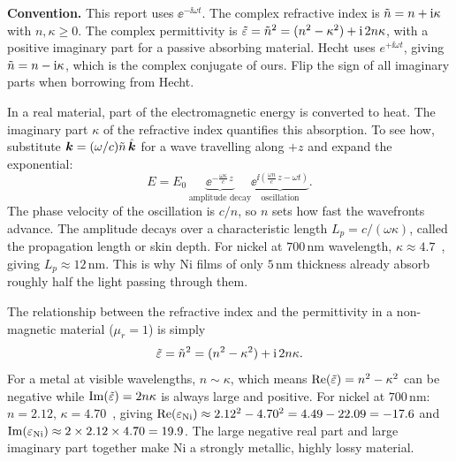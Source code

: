 \begin{warnbox}
\textbf{Convention.} This report uses $\ee^{-\ii\omega t}$. The complex
refractive index is $\tilde{n} = n + \mathrm{i}\kappa$ with $n, \kappa \geq 0$. The complex
permittivity is $\tilde{\varepsilon} = \tilde{n}^2 = (n^2 - \kappa^2) + \mathrm{i}\,2n\kappa$,
with a positive imaginary part for a passive absorbing material. Hecht uses
$e^{+\ii\omega t}$, giving $\tilde{n} = n - \mathrm{i}\kappa$, which is the complex
conjugate of ours. Flip the sign of all imaginary parts when borrowing from
Hecht.
\end{warnbox}

In a real material, part of the electromagnetic energy is converted to heat.
The imaginary part $\kappa$ of the refractive index quantifies this absorption.
To see how, substitute $\bm{k} = (\omega/c)\tilde{n}\,\hat{\bm{k}}$ for a wave
travelling along $+z$ and expand the exponential:
\begin{equation}
  E = E_0 \,
  \underbrace{\ee^{-\frac{\omega\kappa}{c}\,z}}_{\text{amplitude decay}}
  \underbrace{\ee^{\ii\!\left(\frac{\omega n}{c}\,z - \omega t\right)}}_{\text{oscillation}}.
  \label{eq:ch2_absorbing_wave}
\end{equation}
The phase velocity of the oscillation is $c/n$, so $n$ sets how fast the
wavefronts advance. The amplitude decays over a characteristic length
$L_p = c/(\omega\kappa)$, called the propagation length or skin depth. For
nickel at $700$\,nm wavelength, $\kappa \approx 4.7$~\cite{johnson_christy},
giving $L_p \approx 12$\,nm. This is why Ni films of only $5$\,nm thickness
already absorb roughly half the light passing through them.

The relationship between the refractive index and the permittivity in a
non-magnetic material ($\mu_r = 1$) is simply
\begin{equation}
  \tilde{\varepsilon} = \tilde{n}^2 = (n^2 - \kappa^2) + \mathrm{i}\,2n\kappa.
  \label{eq:ch2_eps_nk}
\end{equation}
For a metal at visible wavelengths, $n \sim \kappa$, which means
$\operatorname{Re}(\tilde{\varepsilon}) = n^2 - \kappa^2$ can be negative while $\operatorname{Im}(\tilde{\varepsilon})
= 2n\kappa$ is always large and positive. For nickel at $700$\,nm:
$n = 2.12$, $\kappa = 4.70$~\cite{johnson_christy}, giving
$\operatorname{Re}(\varepsilon_\text{Ni}) \approx 2.12^2 - 4.70^2 = 4.49 - 22.09 = -17.6$ and
$\operatorname{Im}(\varepsilon_\text{Ni}) \approx 2 \times 2.12 \times 4.70 = 19.9$.
The large negative real part and large imaginary part together make Ni a
strongly metallic, highly lossy material.

